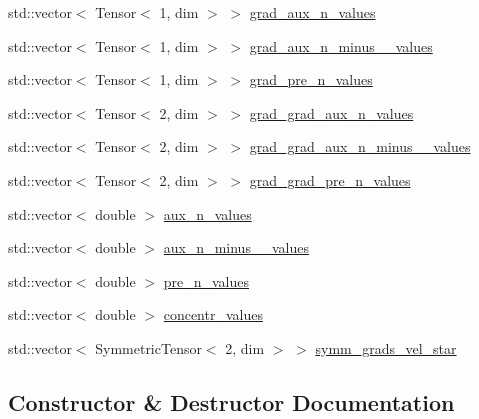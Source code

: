 \begin{DoxyCompactItemize}
\item 
std\+::vector$<$ Tensor$<$ 1, dim $>$ $>$ \hyperlink{struct_assembly_1_1_scratch_1_1diffusion__step_ab292f23db9b98fbccc85767584d1af32}{grad\+\_\+aux\+\_\+n\+\_\+values}
\item 
std\+::vector$<$ Tensor$<$ 1, dim $>$ $>$ \hyperlink{struct_assembly_1_1_scratch_1_1diffusion__step_aa1bdc6944aab9389b86a40688274fdee}{grad\+\_\+aux\+\_\+n\+\_\+minus\+\_\+\_\+values}
\item 
std\+::vector$<$ Tensor$<$ 1, dim $>$ $>$ \hyperlink{struct_assembly_1_1_scratch_1_1diffusion__step_aa11a441604ebd698e5294c6ab3a1ffaf}{grad\+\_\+pre\+\_\+n\+\_\+values}
\item 
std\+::vector$<$ Tensor$<$ 2, dim $>$ $>$ \hyperlink{struct_assembly_1_1_scratch_1_1diffusion__step_a8bc0709a8e9e4ba5e0f663e134444978}{grad\+\_\+grad\+\_\+aux\+\_\+n\+\_\+values}
\item 
std\+::vector$<$ Tensor$<$ 2, dim $>$ $>$ \hyperlink{struct_assembly_1_1_scratch_1_1diffusion__step_a0bbde8769e9f2cc428d9bf0f810c7227}{grad\+\_\+grad\+\_\+aux\+\_\+n\+\_\+minus\+\_\+\_\+values}
\item 
std\+::vector$<$ Tensor$<$ 2, dim $>$ $>$ \hyperlink{struct_assembly_1_1_scratch_1_1diffusion__step_a64c3cf16bc7cf4fa8972153f93014cb9}{grad\+\_\+grad\+\_\+pre\+\_\+n\+\_\+values}
\item 
std\+::vector$<$ double $>$ \hyperlink{struct_assembly_1_1_scratch_1_1diffusion__step_a3790368f163ebc0f1671baa5b535b018}{aux\+\_\+n\+\_\+values}
\item 
std\+::vector$<$ double $>$ \hyperlink{struct_assembly_1_1_scratch_1_1diffusion__step_a29786a1632b7b97b41219b6e6804924e}{aux\+\_\+n\+\_\+minus\+\_\+\_\+values}
\item 
std\+::vector$<$ double $>$ \hyperlink{struct_assembly_1_1_scratch_1_1diffusion__step_ae1586636fe3416c069fe1efaa51c80f2}{pre\+\_\+n\+\_\+values}
\item 
std\+::vector$<$ double $>$ \hyperlink{struct_assembly_1_1_scratch_1_1diffusion__step_a2ee9059b21d32ee414bdf8eb96d3c451}{concentr\+\_\+values}
\item 
std\+::vector$<$ Symmetric\+Tensor$<$ 2, dim $>$ $>$ \hyperlink{struct_assembly_1_1_scratch_1_1diffusion__step_a368904230be585863ee201beabbc8fb6}{symm\+\_\+grads\+\_\+vel\+\_\+star}
\end{DoxyCompactItemize}


\subsection{Constructor \& Destructor Documentation}
\hypertarget{struct_assembly_1_1_scratch_1_1diffusion__step_a5769d06dbf6b99961da088f11f24cce3}{}

